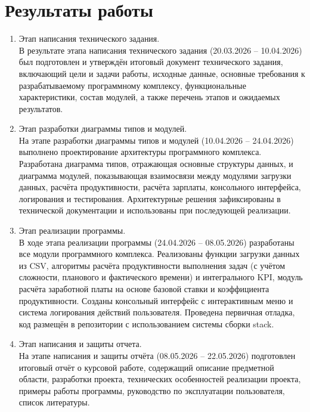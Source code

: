 \documentclass[a4paper, 14pt]{extarticle} %
\begin{document}
    \section{Результаты работы}
        \begin{enumerate}[label=\alph*.]
              \item Этап написания технического задания. \\ В результате этапа написания технического задания (20.03.2026 – 10.04.2026) был подготовлен и утверждён итоговый документ технического задания, включающий цели и задачи работы, исходные данные, основные требования к разрабатываемому программному комплексу, функциональные характеристики, состав модулей, а также перечень этапов и ожидаемых результатов.
            \item Этап разработки диаграммы типов и модулей. \\ На этапе разработки диаграммы типов и модулей (10.04.2026 – 24.04.2026) выполнено проектирование архитектуры программного комплекса. Разработана диаграмма типов, отражающая основные структуры данных, и диаграмма модулей, показывающая взаимосвязи между модулями загрузки данных, расчёта продуктивности, расчёта зарплаты, консольного интерфейса, логирования и тестирования. Архитектурные решения зафиксированы в технической документации и использованы при последующей реализации.
            \item Этап реализации программы. \\ В ходе этапа реализации программы (24.04.2026 – 08.05.2026) разработаны все модули программного комплекса. Реализованы функции загрузки данных из CSV, алгоритмы расчёта продуктивности выполнения задач (с учётом сложности, планового и фактического времени) и интегрального KPI, модуль расчёта заработной платы на основе базовой ставки и коэффициента продуктивности. Созданы консольный интерфейс с интерактивным меню и система логирования действий пользователя. Проведена первичная отладка, код размещён в репозитории с использованием системы сборки stack.
            \item Этап написания и защиты отчета. \\ На этапе написания и защиты отчёта (08.05.2026 – 22.05.2026) подготовлен итоговый отчёт о курсовой работе, содержащий описание предметной области, разработки проекта, технических особенностей реализации проекта, примеры работы программы, руководство по эксплуатации пользователя, список литературы.
        \end{enumerate}
\end{document}
